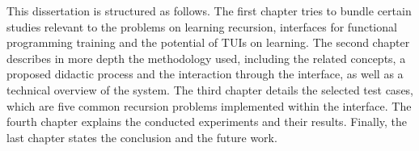 This dissertation is structured as follows.
The first chapter tries to bundle certain studies relevant to the
problems on learning recursion, interfaces for functional programming
training and the potential of TUIs on learning.
The second chapter describes in more depth the methodology used,
including the related concepts, a proposed didactic process and
the interaction through the interface, as well as a technical
overview of the system.
The third chapter details the selected test cases, which are five
common recursion problems implemented within the interface.
The fourth chapter explains the conducted experiments and their
results.
Finally, the last chapter states the conclusion and the future work.

